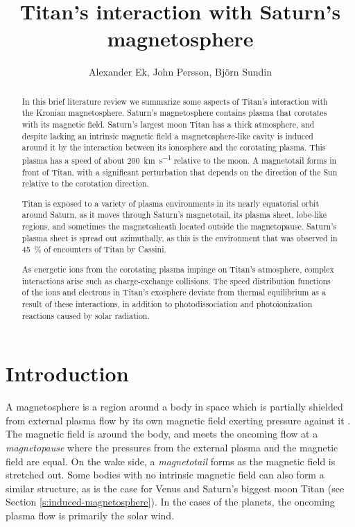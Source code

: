 \documentclass[12pt, parskip=full*, abstract]{scrartcl}
\title{Titan's interaction with Saturn's magnetosphere}
\author{Alexander Ek, John Persson, Björn Sundin}
\begin{document}
\maketitle
\vspace{5mm}
\begin{abstract}
	In this brief literature review we summarize some aspects of Titan's interaction with the Kronian magnetosphere. Saturn's magnetosphere contains plasma that corotates with its magnetic field. Saturn's largest moon Titan has a thick atmosphere, and despite lacking an intrinsic magnetic field a magnetosphere-like cavity is induced around it by the interaction between its ionosphere and the corotating plasma. This plasma has a speed of about \SI{200}{\kilo\metre\per\second} relative to the moon. A magnetotail forms in front of Titan, with a significant perturbation that depends on the direction of the Sun relative to the corotation direction. 
	
	Titan is exposed to a variety of plasma environments in its nearly equatorial orbit around Saturn, as it moves through Saturn's magnetotail, its plasma sheet, lobe-like regions, and sometimes the magnetosheath located outside the magnetopause. Saturn's plasma sheet is spread out azimuthally, as this is the environment that was observed in \SI{45}{\percent} of encounters of Titan by Cassini. 
	
	As energetic ions from the corotating plasma impinge on Titan's atmosphere, complex interactions arise such as charge-exchange collisions. The speed distribution functions of the ions and electrons in Titan's exosphere deviate from thermal equilibrium as a result of these interactions, in addition to photodissociation and photoionization reactions caused by solar radiation.
\end{abstract}

\newpage
\tableofcontents
\newpage

\section{Introduction}

A magnetosphere is a region around a body in space which is partially shielded from external plasma flow by its own magnetic field exerting pressure against it \parencite{encyclopedia-magnetospheres}. The magnetic field is  around the body, and meets the oncoming flow at a \textit{magnetopause} where the pressures from the external plasma and the magnetic field are equal. On the wake side, a \textit{magnetotail} forms as the magnetic field is stretched out. Some bodies with no intrinsic magnetic field can also form a similar structure, as is the case for Venus and Saturn's biggest moon Titan (see Section \ref{s:induced-magnetosphere}). In the cases of the planets, the oncoming plasma flow is primarily the solar wind. 
\end{document}
